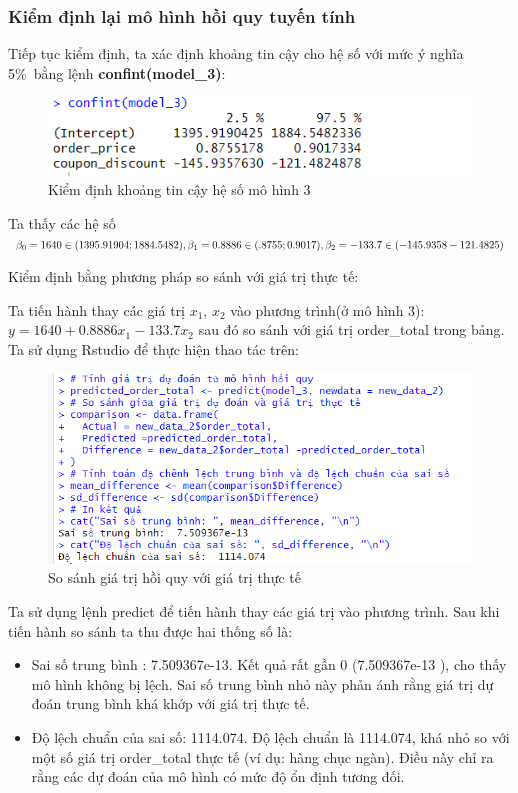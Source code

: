 \subsubsection{Kiểm định lại mô hình hồi quy tuyến tính}
Tiếp tục kiểm định, ta xác định khoảng tin cậy cho hệ số với mức ý nghĩa 5\%\ bằng lệnh \textbf{confint(model\_3)}:
\begin{figure}[H]
  \centering
  \includegraphics[width=0.7\linewidth]{graphics/5.5.5.png}
  \caption{Kiểm định khoảng tin cậy hệ số mô hình 3 }
\end{figure}

Ta thấy các hệ số $\beta_0= 1640\in(1395.91904; 1884.5482), \beta_1= 0.8886\in(.8755;0.9017),\\ \beta_2= -133.7\in(-145.9358 -121.4825)$

Kiểm định bằng phương pháp so sánh với giá trị thực tế:

Ta tiến hành thay các giá trị $x_1$, $x_2$ vào phương trình(ở mô hình 3): $y= 1640 + 0.8886x_1 - 133.7 x_2$ sau đó so sánh với giá trị order\_total trong bảng. Ta sử dụng Rstudio để thực hiện thao tác trên:

\begin{figure}[H]
  \centering
  \includegraphics[width=0.5\linewidth]{graphics/5.5.7.png}
  \caption{So sánh giá trị hồi quy với giá trị thực tế }
\end{figure}

Ta sử dụng lệnh predict để tiến hành thay các giá trị vào phương trình. Sau khi tiến hành so sánh ta thu được hai thống số là:
\begin{itemize}
  \item Sai số trung bình : 7.509367e-13. Kết quả rất gần 0 (7.509367e-13 ), cho thấy mô hình không bị lệch. Sai số trung bình nhỏ này phản ánh rằng giá trị dự đoán trung bình khá khớp với giá trị thực tế.
  \item Độ lệch chuẩn của sai số: 1114.074. Độ lệch chuẩn là 1114.074, khá nhỏ so với một số giá trị order\_total thực tế (ví dụ: hàng chục ngàn). Điều này chỉ ra rằng các dự đoán của mô hình có mức độ ổn định tương đối.
\end{itemize}

